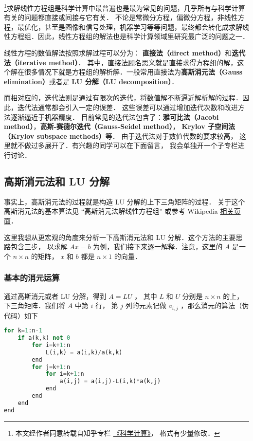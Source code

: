 

\footnote{本文经作者同意转载自知乎专栏 \href{https://www.zhihu.com/column/c_1226443594048942080}{《科学计算》}， 格式有少量修改．}求解线性方程组是科学计算中最普遍也是最为常见的问题，几乎所有与科学计算有关的问题都直接或间接与它有关． 不论是常微分方程，偏微分方程，非线性方程，最优化，甚至是图像和信号处理，机器学习等等问题，最终都会转化成求解线性方程组．因此，线性方程组的解法也是科学计算领域里研究最广泛的问题之一．

线性方程的数值解法按照求解过程可以分为： \textbf{直接法（direct method）}和\textbf{迭代法（iterative method）}． 其中，直接法顾名思义就是直接求得方程组的解，这个解在很多情况下就是方程组的解析解．一般常用直接法为\textbf{高斯消元法（Gauss elimination）}或者是 \textbf{LU 分解（LU decomposition）}．

而相对应的，迭代法则是通过有限次的迭代，将数值解不断逼近解析解的过程．因此，迭代法通常都会引入一定的误差． 这些误差可以通过增加迭代次数和改进方法逐渐逼近于机器精度． 目前常见的迭代法包含了：\textbf{雅可比法（Jacobi method）}，\textbf{高斯-赛德尔迭代（Gauss-Seidel method）}， \textbf{Krylov 子空间法（Krylov subspace methods）}等． 由于迭代法对于数值代数的要求较高， 这里就不做过多展开了．有兴趣的同学可以在下面留言， 我会单独开一个子专栏进行讨论．

\subsection{高斯消元法和 LU 分解}

事实上，高斯消元法的过程就是构造 LU 分解的上下三角矩阵的过程． 关于这个高斯消元法的基本算法见 “高斯消元法解线性方程组” 或参考 Wikipedia \href{https://en.wikipedia.org/wiki/Gaussian_elimination}{相关页面}．

这里我想从更宏观的角度来分析一下高斯消元法和 LU 分解．这个方法的主要思路包含三步， 以求解 $Ax=b$ 为例，我们接下来逐一解释．注意，这里的 $A$  是一个 $n\times n$ 的矩阵， $x$ 和 $b$ 都是 $n\times1$ 的向量．

\subsubsection{基本的消元运算}

通过高斯消元或者 LU 分解，得到 $A=LU$ ， 其中 $L$ 和 $U $ 分别是 $n\times n$ 的上，下三角矩阵．我们将 $A$ 中第 $i$ 行， 第 $j$ 列的元素记做 $a_{i,j}$ ，那么消元的算法（伪代码）如下
\begin{lstlisting}[language=python]
for k=1:n-1
    if a(k,k) not 0
        for i=k+1:n
            L(i,k) = a(i,k)/a(k,k)
        end
        for j=k+1:n
            for i=k+1:n
                a(i,j) = a(i,j)-L(i,k)*a(k,j)
            end
        end
    end
end
\end{lstlisting}

